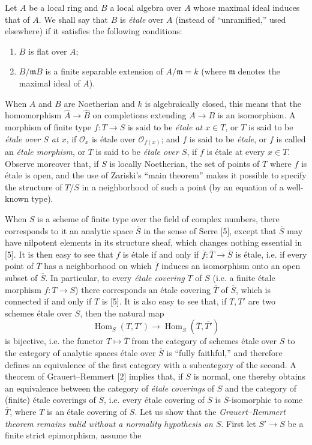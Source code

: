 Let $A$ be a local ring and $B$ a local algebra over $A$ whose maximal ideal
induces that of $A$. We shall say that $B$ is \emph{étale} over $A$ (instead of
“unramified,” used elsewhere) if it satisfies the following conditions:
\begin{enumerate}
\item[(i)] $B$ is flat over $A$;
\item[(ii)] $B/\mathfrak mB$ is a finite separable extension of
$A/\mathfrak m=k$ (where $\mathfrak m$ denotes the maximal ideal of $A$).
\end{enumerate}
When $A$ and $B$ are Noetherian and $k$ is algebraically closed, this means that
the homomorphism $\widehat A\longrightarrow\widehat B$ on completions extending
$A\longrightarrow B$ is an isomorphism. A morphism of finite type
$f:T\longrightarrow S$ is said to be \emph{étale at $x\in T$}, or $T$ is said
to be \emph{étale over $S$ at $x$}, if $\mathcal O_x$ is étale over
$\mathcal O_{f(x)}$; and $f$ is said to be \emph{étale}, or $f$ is called an
\emph{étale morphism}, or $T$ is said to be \emph{étale over $S$}, if $f$ is
étale at every $x\in T$. Observe moreover that, if $S$ is locally Noetherian,
the set of points of $T$ where $f$ is étale is open, and the use of Zariski's
“main theorem” makes it possible to specify the structure of $T/S$ in a
neighborhood of such a point (by an equation of a well-known type).

When $S$ is a scheme of finite type over the field of complex numbers, there
corresponds to it an analytic space $\overline S$ in the sense of Serre [5],
except that $\overline S$ may have nilpotent elements in its structure sheaf,
which changes nothing essential in [5]. It is then easy to see that $f$ is
étale if and only if $\overline f:\overline T\longrightarrow\overline S$ is
étale, i.e. if every point of $\overline T$ has a neighborhood on which
$\overline f$ induces an isomorphism onto an open subset of $\overline S$. In
particular, to every \emph{étale covering} $T$ of $S$ (i.e. a finite étale
morphism $f:T\longrightarrow S$) there corresponds an étale covering
$\overline T$ of $\overline S$, which is connected if and only if $T$ is [5].
It is also easy to see that, if $T,T'$ are two schemes étale over $S$, then the
natural map
\[
  \operatorname{Hom}_S(T,T')\longrightarrow
  \operatorname{Hom}_{\overline S}(\overline T,\overline{T'})
\]
is bijective, i.e. the functor $T\longmapsto\overline T$ from the category of
schemes étale over $S$ to the category of analytic spaces étale over
$\overline S$ is “fully faithful,” and therefore defines an equivalence of the
first category with a subcategory of the second. A theorem of
Grauert--Remmert [2] implies that, if $S$ is normal, one thereby obtains an
equivalence between the category of \emph{étale coverings} of $S$ and the
category of (finite) étale coverings of $\overline S$, i.e. every étale
covering of $\overline S$ is $\overline S$-isomorphic to some $\overline T$,
where $T$ is an étale covering of $S$. Let us show that the
\emph{Grauert--Remmert theorem remains valid without a normality hypothesis on
$S$}. First let $S'\longrightarrow S$ be a finite strict epimorphism, assume
the

